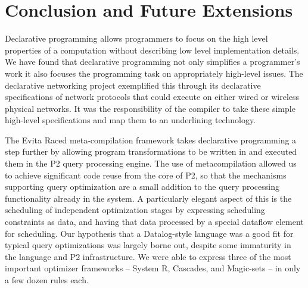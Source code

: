 \chapter[Conclusion and Future Extensions]{Conclusion and Future Extensions}
\label{ch:conclusion}


Declarative programming allows programmers to focus on the high level properties of a
computation without describing low level implementation details. We have found that 
declarative programming not only simplifies a programmer's work it also focuses the
programming task on appropriately high-level issues. The declarative networking project
exemplified this through its declarative specifications of network protocols that could 
execute on either wired or wireless physical networks. It was the responsibility of the
compiler to take these simple high-level specifications and map them to an underlining
technology. 

The Evita Raced meta-compilation framework takes declarative programming a step
further by allowing \OVERLOG program transformations to be written in \OVERLOG
and executed them in the P2 query processing engine.  The use of
metacompilation allowed us to achieve significant code reuse from the core of
P2, so that the mechanisms supporting query optimization are a small addition
to the query processing functionality already in the system.  A particularly
elegant aspect of this is the scheduling of independent optimization stages by
expressing scheduling constraints as data, and having that data processed by a
special dataflow element for scheduling.  Our hypothesis that a Datalog-style
language was a good fit for typical query optimizations was largely borne out,
despite some immaturity in the \OVERLOG language and P2 infrastructure.  We
were able to express three of the most important optimizer frameworks -- System
R, Cascades, and Magic-sets -- in only a few dozen rules each.


